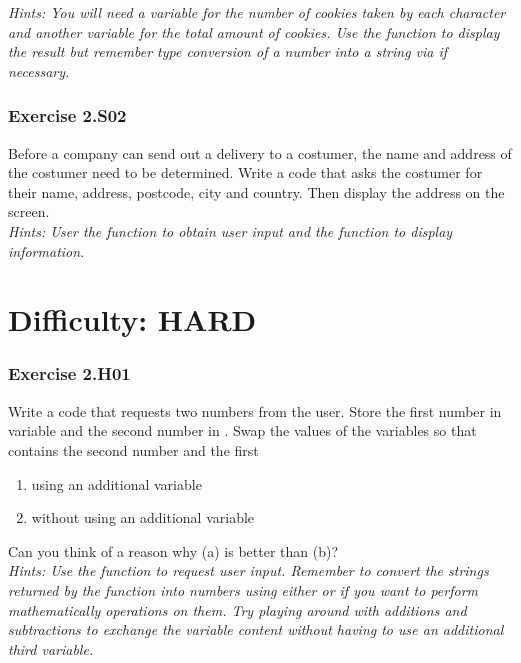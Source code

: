 \textit{Hints:
You will need a variable for the number of cookies taken by each character and another
variable for the total amount of cookies. Use the {} function to display the result but remember type conversion of a number into a string via {} if necessary.}\\[1cm]




\subsubsection*{Exercise 2.S02}
Before a company can send out a delivery to a costumer, the name and address of the
costumer need to be determined. Write a code that asks the costumer for their name,
address, postcode, city and country. Then display the address on the screen.\\


\textit{Hints:
User the {} function to obtain user input and the {} function to display information.}\\[1cm]




\newpage
\section{Difficulty: HARD}

\subsubsection*{Exercise 2.H01 \red{[M]}}
Write a code that requests two numbers from the user. Store the first number in variable
{} and the second number in {}.
Swap the values of the variables so that {} contains the second number and {} the
first
\begin{enumerate}[label=(\alph*)]
	\item using an additional variable {}
	\item without using an additional variable
\end{enumerate}
Can you think of a reason why (a) is better than (b)?\\


\textit{Hints:
Use the {} function to request user input. Remember to convert the strings returned by the {} function into numbers using either {} or {} if you want to perform mathematically operations on them. Try playing around with additions and subtractions to exchange the variable content without having to use an additional third variable.}\\[1cm]


